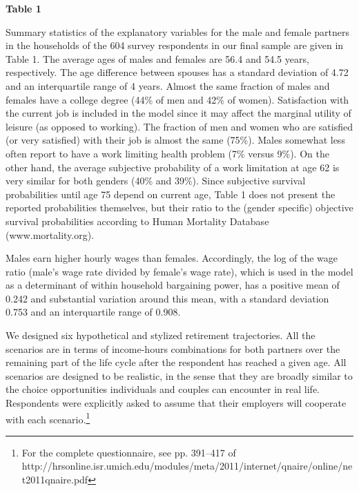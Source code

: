 \documentclass[11pt,letter]{article}
\begin{document}
\begin{center}
\textbf{Table 1}
\end{center}

\par Summary statistics of the explanatory variables for the male and female partners in the households of the 604 survey respondents in our final sample are given in Table 1. The average ages of males and females are 56.4 and 54.5 years, respectively. The age difference between spouses has a standard deviation of 4.72 and an interquartile range of 4 years. Almost the same fraction of males and females have a college degree (44\% of men and 42\% of women). Satisfaction with the current job is included in the model since it may affect the marginal utility of leisure (as opposed to working). The fraction of men and women who are satisfied (or very satisfied) with their job is almost the same (75\%). Males somewhat less often report to have a work limiting health problem (7\% versus 9\%). On the other hand, the average subjective probability of a work limitation at age 62 is very similar for both genders (40\% and 39\%). Since subjective survival probabilities until age 75 depend on current age, Table 1 does not present the reported probabilities themselves, but their ratio to the (gender specific) objective survival probabilities according to Human Mortality Database (www.mortality.org).

Males earn higher hourly wages than females. Accordingly, the log of the wage ratio (male's wage rate divided by female's wage rate), which is used in the model as a determinant of within household bargaining power, has a positive mean of 0.242 and substantial variation around this mean, with a standard deviation 0.753 and an interquartile range of 0.908.

\par We designed six hypothetical and stylized retirement trajectories. All the scenarios are in terms of income-hours combinations for both partners over the remaining part of the life cycle after the respondent has reached a given age. All scenarios are designed to be realistic, in the sense that they are broadly  similar to the choice opportunities individuals and couples can encounter in real life. Respondents were explicitly asked to assume that their employers will cooperate with each scenario.\footnote{For the complete questionnaire, see pp. 391--417 of \\
http://hrsonline.isr.umich.edu/modules/meta/2011/internet/qnaire/online/net2011qnaire.pdf}
\end{document}
